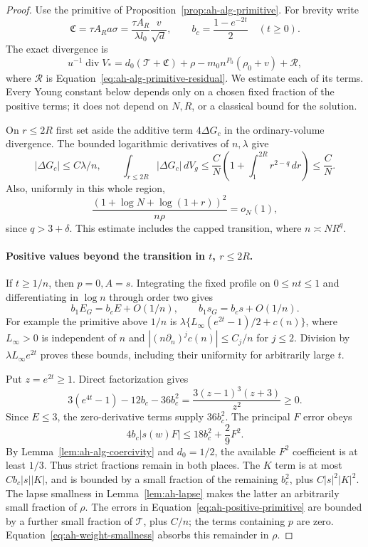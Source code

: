 \begin{proof}
Use the primitive of Proposition~\ref{prop:ah-alg-primitive}.
For brevity write
\[
 \mathfrak C=\tau A_Ra\sigma
     =\frac{\tau A_R}{\lambda l_0}\frac{v}{\sqrt d},
 \qquad
 b_c=\frac{1-e^{-2t}}2\quad(t\ge0).
\]
The exact divergence is
\begin{equation}\label{eq:ah-mass-divergence}
 u^{-1}\operatorname{div}V_*
   =d_0(\mathcal T+\mathfrak C)+\rho
      -m_0n^{P_0}(\rho_0+v)+\mathcal R,
\end{equation}
where \(\mathcal R\) is Equation~\eqref{eq:ah-alg-primitive-residual}.
We estimate each of its terms. Every Young constant below depends
only on a chosen fixed fraction of the positive terms; it does not
depend on \(N,R\), or a classical bound for the solution.

On \(r\le2R\) first set aside the additive term
\(4\Delta G_c\) in the ordinary-volume divergence. The bounded
logarithmic derivatives of \(n,\lambda\) give
\[
 |\Delta G_c|\le C\lambda/n,\qquad
 \int_{r\le2R}|\Delta G_c|\,dV_g
       \le\frac C N\left(1+\int_1^{2R}r^{2-q}\,dr\right)
       \le\frac C N .
\]
Also, uniformly in this whole region,
\begin{equation}\label{eq:ah-weight-smallness}
 \frac{(1+\log N+\log(1+r))^2}{n\rho}=o_N(1),
\end{equation}
since \(q>3+\delta\). This estimate includes the capped transition,
where \(n\asymp NR^q\).

\paragraph{Positive values beyond the transition in \(t\), \(r\le2R\).}
If \(t\ge1/n\), then \(p=0,A=s\). Integrating the fixed profile on
\(0\le nt\le1\) and differentiating in \(\log n\) through order two
gives
\begin{equation}\label{eq:ah-positive-primitive}
 b_1E_G=b_cE+O(1/n),\qquad
 b_1s_G=b_cs+O(1/n).
\end{equation}
For example the primitive above \(1/n\) is
\(\lambda\{L_\infty(e^{2t}-1)/2+c(n)\}\),
where \(L_\infty>0\) is independent of \(n\) and
\(|(n\partial_n)^jc(n)|\le C_j/n\) for \(j\le2\).
Division by \(\lambda L_\infty e^{2t}\) proves these bounds,
including their uniformity for arbitrarily large \(t\).

Put \(z=e^{2t}\ge1\). Direct factorization gives
\[
 3(e^{4t}-1)-12b_c-36b_c^2
  =\frac{3(z-1)^3(z+3)}{z^2}\ge0.
\]
Since \(E\le3\), the zero-derivative terms supply \(36b_c^2\).
The principal \(F\) error obeys
\[
 4b_c|s(w)F|\le18b_c^2+\frac29F^2.
\]
By Lemma~\ref{lem:ah-alg-coercivity} and \(d_0=1/2\),
the available \(F^2\) coefficient is at least \(1/3\).
Thus strict fractions remain in both places.
The \(K\) term is at most \(Cb_c|s||K|\), and is bounded by a
small fraction of the remaining \(b_c^2\), plus
\(C|s|^2|K|^2\). The lapse smallness in
Lemma~\ref{lem:ah-lapse} makes the latter an arbitrarily small
fraction of \(\rho\).
The errors in Equation~\eqref{eq:ah-positive-primitive} are bounded
by a further small fraction of \(\mathcal T\), plus \(C/n\);
the terms containing \(p\) are zero. Equation~\eqref{eq:ah-weight-smallness}
absorbs this remainder in \(\rho\).


\end{proof}
